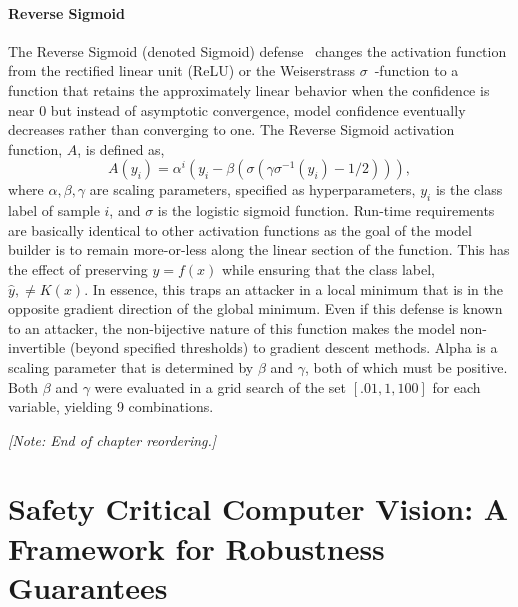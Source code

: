 \documentclass[journal]{IEEEtran}
\newcommand{\cm}[1]{\textit{{\color{blue}#1}}}
\begin{document}
\paragraph{Reverse Sigmoid}
The Reverse Sigmoid (denoted Sigmoid) defense~\cite{reverse_sigmoid} changes the activation function from the rectified linear unit (ReLU) or the Weiserstrass $\sigma \!\!$~-function to a function that retains the approximately linear behavior when the confidence is near 0 but instead of asymptotic convergence, model confidence eventually decreases rather than converging to one. The Reverse Sigmoid activation function, $A$, is defined as,
$$
    A(y_i) = \alpha ^i (y_i - \beta(\sigma(\gamma \sigma^{-1}(y_i) - 1/2))),
$$
where $\alpha, \beta, \gamma$ are scaling parameters, specified as hyperparameters, $y_i$ is the class label of sample $i$, and $\sigma$ is the logistic sigmoid function. Run-time requirements are basically identical to other activation functions as the goal of the model builder is to remain more-or-less along the linear section of the function. This has the effect of preserving $y = f(x)$ while ensuring that the class label, $\hat{y},  \neq K(x)$. In essence, this traps an attacker in a local minimum that is in the opposite gradient direction of the global minimum. Even if this defense is known to an attacker, the non-bijective nature of this function makes the model non-invertible (beyond specified thresholds) to gradient descent methods. Alpha is a scaling parameter that is determined by $\beta$ and $\gamma$, both of which must be positive. Both $\beta$ and $\gamma$ were evaluated in a grid search of the set $[.01, 1, 100]$ for each variable, yielding 9 combinations.

\cm{[Note: End of chapter reordering.]}

\section{Safety Critical Computer Vision: A Framework for Robustness Guarantees}
\label{safety-critical}
\end{document}
